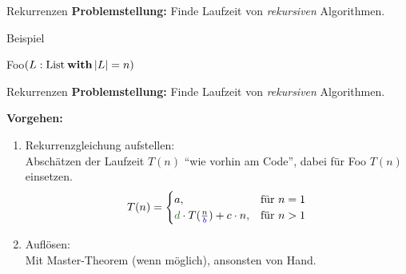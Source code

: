 
\begin{frame}{Rekurrenzen}
	\textbf{Problemstellung:} Finde Laufzeit von \emph{rekursiven} Algorithmen.
	
	\begin{exampleblock}{Beispiel}
		\begin{algorithm}[H]
			\KwMethod Foo$(L: \|List| \: \KwSty{with} \size{L} = n)$
		\end{algorithm}
	\end{exampleblock}
\end{frame}

\begin{frame}{Rekurrenzen}
	\textbf{Problemstellung:} Finde Laufzeit von \emph{rekursiven} Algorithmen.
	
	\textbf{Vorgehen:}
	\begin{enumerate}
		\item Rekurrenzgleichung aufstellen:\\
		Abschätzen der Laufzeit $T(n)$ \enquote{wie vorhin am Code}, dabei für Foo $T(n)$ einsetzen.
		\[
		T(n) = 
		\begin{cases}
		a,  & \text{für } n = 1 \\
		\textcolor{darkgreen}{d} \cdot T\large(\frac{n}{\textcolor{blue}{b}}\large) + c\·n, & \text{für } n > 1
		\end{cases}
		\]
		
		\pause
		\item Auflösen:\\ 
		Mit Master-Theorem (wenn möglich), ansonsten von Hand.
	\end{enumerate}

\end{frame}

